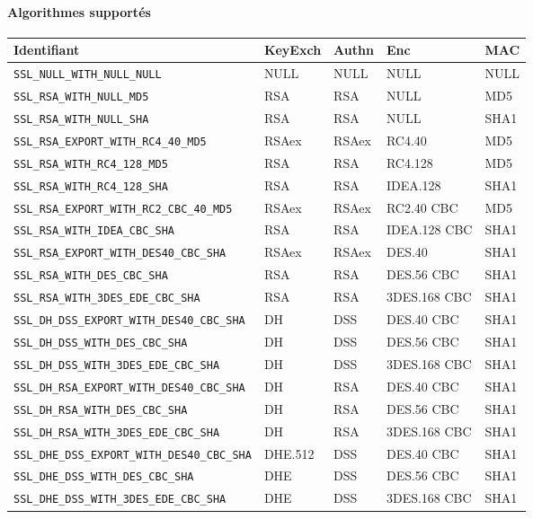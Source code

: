 \documentclass[a4paper,11pt,french]{article}
\begin{document}
\paragraph{Algorithmes supportés} 
\begin{center}
\begin{tabularx}{17cm}{|l|l|l|X|l|}
\hline
\textbf{Identifiant} & \textbf{KeyExch} & \textbf{Authn}& \textbf{Enc}& \textbf{MAC}\\
\hline
\verb+SSL_NULL_WITH_NULL_NULL+&NULL&NULL&NULL&NULL\\
\hline
\verb+SSL_RSA_WITH_NULL_MD5+&RSA&RSA&NULL&MD5\\
\hline 
\verb+SSL_RSA_WITH_NULL_SHA+&RSA&RSA&NULL&SHA1\\
\hline 
\verb+SSL_RSA_EXPORT_WITH_RC4_40_MD5+&RSAex&RSAex&RC4.40&MD5\\
\hline
\verb+SSL_RSA_WITH_RC4_128_MD5+&RSA&RSA&RC4.128&MD5\\
\hline
\verb+SSL_RSA_WITH_RC4_128_SHA+ &RSA&RSA&IDEA.128&SHA1\\
\hline
\verb+SSL_RSA_EXPORT_WITH_RC2_CBC_40_MD5+&RSAex&RSAex&RC2.40 CBC&MD5 \\
\hline
\verb+SSL_RSA_WITH_IDEA_CBC_SHA+& RSA&RSA&IDEA.128 CBC&SHA1\\
\hline
\verb+SSL_RSA_EXPORT_WITH_DES40_CBC_SHA+&RSAex&RSAex&DES.40&SHA1\\
\hline
\verb+SSL_RSA_WITH_DES_CBC_SHA+& RSA&RSA&DES.56 CBC&SHA1\\
\hline
\verb+SSL_RSA_WITH_3DES_EDE_CBC_SHA+& RSA&RSA&3DES.168 CBC&SHA1\\
\hline
\verb+SSL_DH_DSS_EXPORT_WITH_DES40_CBC_SHA+&DH&DSS&DES.40 CBC&SHA1\\
\hline
\verb+SSL_DH_DSS_WITH_DES_CBC_SHA+ & DH&DSS&DES.56 CBC&SHA1\\
\hline 
\verb+SSL_DH_DSS_WITH_3DES_EDE_CBC_SHA+ & DH&DSS&3DES.168 CBC&SHA1\\
\hline
\verb+SSL_DH_RSA_EXPORT_WITH_DES40_CBC_SHA+ & DH&RSA&DES.40 CBC&SHA1\\
\hline
\verb+SSL_DH_RSA_WITH_DES_CBC_SHA+ & DH&RSA&DES.56 CBC&SHA1\\
\hline
\verb+SSL_DH_RSA_WITH_3DES_EDE_CBC_SHA+ & DH&RSA&3DES.168 CBC&SHA1\\
\hline
\verb+SSL_DHE_DSS_EXPORT_WITH_DES40_CBC_SHA+ & DHE.512&DSS&DES.40 CBC&SHA1\\
\hline
\verb+SSL_DHE_DSS_WITH_DES_CBC_SHA+ & DHE&DSS&DES.56 CBC&SHA1\\
\hline
\verb+SSL_DHE_DSS_WITH_3DES_EDE_CBC_SHA+ & DHE&DSS&3DES.168 CBC&SHA1\\

\end{tabularx}
\end{center}
\end{document}
